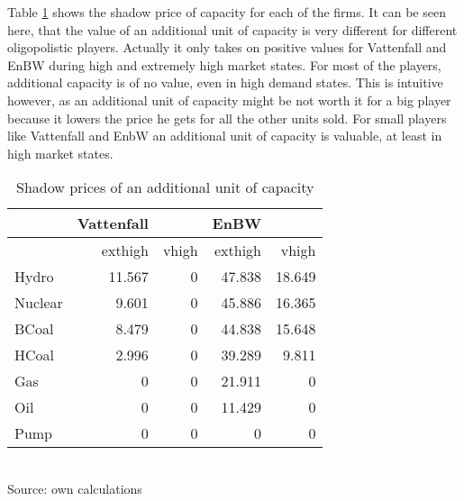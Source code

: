 Table \ref{tab:lambda} shows the shadow price of capacity for each of the firms. It can be seen here, that the value of an additional unit of capacity is very different for different oligopolistic players. Actually it only takes on positive values for Vattenfall and EnBW during high and extremely high market states. For most of the players, additional capacity is of no value, even in high demand states. This is intuitive however, as an additional unit of capacity might be not worth it for a big player because it lowers the price he gets for all the other units sold. For small players like Vattenfall and EnbW an additional unit of capacity is valuable, at least in high market states.

\begin{table}[htb]
\centering
\caption{Shadow prices of an additional unit of capacity}
\vspace{0.3cm}
\begin{tabular}{lrrrr}
\hline
           & Vattenfall &            &       EnBW &            \\
\hline
           &    exthigh &      vhigh &    exthigh &      vhigh \\
\hline
     Hydro &     11.567 &          0 &     47.838 &     18.649 \\

   Nuclear &      9.601 &          0 &     45.886 &     16.365 \\

     BCoal &      8.479 &          0 &     44.838 &     15.648 \\

     HCoal &      2.996 &          0 &     39.289 &      9.811 \\

       Gas &          0 &          0 &     21.911 &          0 \\

       Oil &          0 &          0 &     11.429 &          0 \\

      Pump &          0 &          0 &          0 &          0 \\
\hline
\end{tabular}  
\label{tab:lambda}
\\
\vspace{0.3cm}
\scriptsize Source: own calculations
\end{table}

